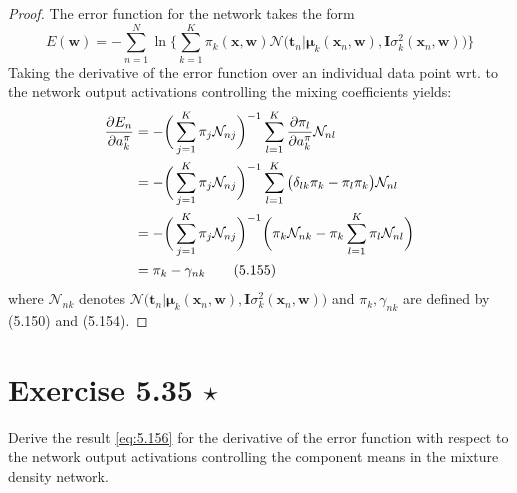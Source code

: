 \vspace{1em}

\begin{proof}
    The error function for the network takes the form
    \begin{equation*}
        E(\mathbf{w}) 
        = -\sum_{n=1}^{N} \ln
        \bigg\{\sum_{k=1}^{K} \pi_k(\mathbf{x}, \mathbf{w}) 
            \mathcal{N}\big(\mathbf{t}_n | \bm{\mu}_k(\mathbf{x}_n, \mathbf{w}),
        \mathbf{I}\sigma_k^2(\mathbf{x}_n, \mathbf{w})\big)\bigg\}
        \tag{5.153}\label{eq:5.153}
    \end{equation*}
    Taking the derivative of the error function over an individual data point 
    wrt. to the network output activations controlling the mixing coefficients
    yields:
    \begin{align*}
        \pdv{E_n}{a_k^\pi}
        &= -\bigg(\sum_{j=1}^{K} \pi_j \mathcal{N}_{nj}\bigg)^{-1}
        \sum_{l=1}^{K} \pdv{\pi_l}{a_k^\pi} \mathcal{N}_{nl} \\
        &= -\bigg(\sum_{j=1}^{K} \pi_j \mathcal{N}_{nj}\bigg)^{-1}
        \sum_{l=1}^{K} \big(\delta_{lk} \pi_k - \pi_l \pi_k\big) \mathcal{N}_{nl} \\
        &= -\bigg(\sum_{j=1}^{K} \pi_j \mathcal{N}_{nj}\bigg)^{-1}
        \bigg(\pi_k \mathcal{N}_{nk} - \pi_k \sum_{l=1}^{K} \pi_l \mathcal{N}_{nl}\bigg) \\
        &= \pi_k - \gamma_{nk} 
        \tag{5.155}\label{eq:5.155}
    \end{align*}
    where $\mathcal{N}_{nk}$ denotes 
    $\mathcal{N}\big(\mathbf{t}_n | \bm{\mu}_k(\mathbf{x}_n, \mathbf{w}), 
        \mathbf{I}\sigma_k^2(\mathbf{x}_n, \mathbf{w})\big)$ and $\pi_k, \gamma_{nk}$ 
        are defined by (5.150) and (5.154).
\end{proof}

\section*{Exercise 5.35 $\star$}
Derive the result \eqref{eq:5.156} for the derivative
of the error function with respect to the network output
activations controlling the component means in the mixture
density network.

\vspace{1em}

